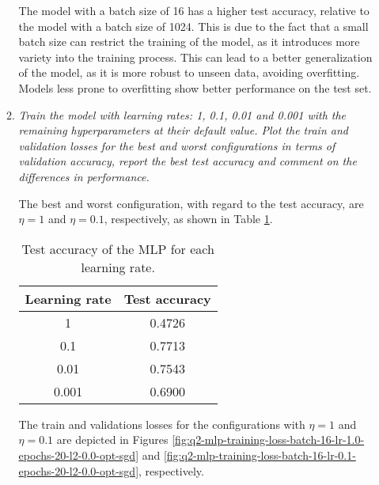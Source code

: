 \documentclass[12pt]{article}
\begin{document}
\begin{enumerate}[leftmargin=\labelsep]
\begin{enumerate}[label=\alph*)]
                    The model with a batch size of 16 has a higher test accuracy, relative to the model with a batch size of 1024. This is due to the fact that a small batch size can restrict the training of the model, as it introduces more variety into the training process. This can lead to a better generalization of the model, as it is more robust to unseen data, avoiding overfitting. Models less prone to overfitting show better performance on the test set.

                    \vspace{12pt}

              \item \textit{Train the model with learning rates: 1, 0.1, 0.01 and 0.001 with the remaining
                        hyperparameters at their default value. Plot the train and validation losses for the best
                        and worst configurations in terms of validation accuracy, report the best test accuracy
                        and comment on the differences in performance.}

                    \vspace{12pt}

                    The best and worst configuration, with regard to the test accuracy, are $\eta = 1$ and $\eta = 0.1$, respectively, as shown in Table \ref{tab:mlp-learning-rate-accuracy}.

                    \begin{table}[H]
                        \centering
                        \begin{tabular}{|c|c|}
                            \hline
                            Learning rate & Test accuracy \\ \hline
                            1             & 0.4726        \\ \hline
                            0.1           & 0.7713        \\ \hline
                            0.01          & 0.7543        \\ \hline
                            0.001         & 0.6900        \\ \hline
                        \end{tabular}
                        \caption{Test accuracy of the MLP for each learning rate.}
                        \label{tab:mlp-learning-rate-accuracy}
                    \end{table}

                    The train and validations losses for the configurations with $\eta = 1$ and $\eta = 0.1$ are depicted in Figures \ref{fig:q2-mlp-training-loss-batch-16-lr-1.0-epochs-20-l2-0.0-opt-sgd} and \ref{fig:q2-mlp-training-loss-batch-16-lr-0.1-epochs-20-l2-0.0-opt-sgd}, respectively.


\end{enumerate}
\end{enumerate}
\end{document}
